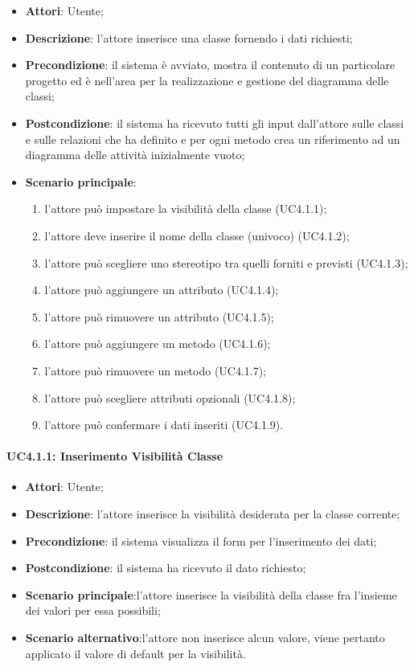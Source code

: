 \begin{itemize}
\item \textbf{Attori}: Utente;
\item \textbf{Descrizione}: l'attore inserisce una classe fornendo i dati richiesti;
\item \textbf{Precondizione}: il sistema è avviato, mostra il contenuto di un particolare progetto ed è nell'area per la realizzazione e gestione del diagramma delle classi;
\item \textbf{Postcondizione}: il sistema ha ricevuto tutti gli input dall'attore sulle classi e sulle relazioni che ha definito e per ogni metodo crea un riferimento ad un diagramma delle attività inizialmente vuoto;
\item \textbf{Scenario principale}:
	\begin{enumerate}
		\item l'attore può impostare la visibilità della classe (UC4.1.1);
		\item l'attore deve inserire il nome della classe (univoco) (UC4.1.2);
		\item l'attore può scegliere uno stereotipo tra quelli forniti e previsti (UC4.1.3);
		\item l'attore può aggiungere un attributo (UC4.1.4);
		\item l'attore può rimuovere un attributo (UC4.1.5);
		\item l'attore può aggiungere un metodo (UC4.1.6);
		\item l'attore può rimuovere un metodo (UC4.1.7);
		\item l'attore può scegliere attributi opzionali (UC4.1.8);
		\item l'attore può confermare i dati inseriti (UC4.1.9).
	\end{enumerate}
\end{itemize}

\paragraph{UC4.1.1: Inserimento Visibilità Classe}
\label{UC4.1.1}

\begin{itemize}
\item \textbf{Attori}: Utente;
\item \textbf{Descrizione}: l'attore inserisce la visibilità desiderata per la classe corrente;
\item \textbf{Precondizione}: il sistema visualizza il form per l'inserimento dei dati;
\item \textbf{Postcondizione}: il sistema ha ricevuto il dato richiesto;
\item \textbf{Scenario principale}:l'attore inserisce la visibilità della classe fra l'insieme dei valori per essa possibili;
\item \textbf{Scenario alternativo}:l'attore non inserisce alcun valore, viene pertanto applicato il valore di default per la visibilità.
\end{itemize}

